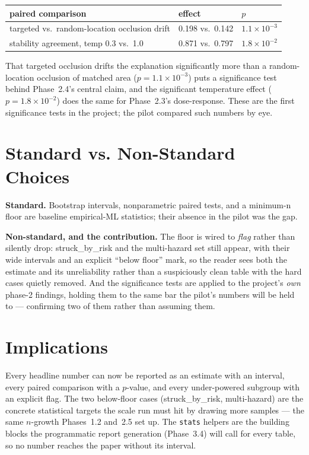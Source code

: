 \begin{center}
\begin{tabular}{p{6.4cm}p{3.0cm}p{2.6cm}}
\toprule
\textbf{paired comparison} & \textbf{effect} & \textbf{$p$} \\
\midrule
targeted vs.\ random-location occlusion drift & 0.198 vs.\ 0.142 & $1.1\times10^{-3}$ \\
stability agreement, temp 0.3 vs.\ 1.0        & 0.871 vs.\ 0.797 & $1.8\times10^{-2}$ \\
\bottomrule
\end{tabular}
\label{tab:p31-wilcoxon}
\end{center}

That targeted occlusion drifts the explanation significantly more than a random-location occlusion of
matched area ($p = 1.1\times10^{-3}$) puts a significance test behind Phase~2.4's central claim, and the
significant temperature effect ($p = 1.8\times10^{-2}$) does the same for Phase~2.3's dose-response.
These are the first significance tests in the project; the pilot compared such numbers by eye.

\section{Standard vs. Non-Standard Choices}

\textbf{Standard.} Bootstrap intervals, nonparametric paired tests, and a minimum-n floor are baseline
empirical-ML statistics; their absence in the pilot was the gap.

\textbf{Non-standard, and the contribution.} The floor is wired to \emph{flag} rather than silently
drop: struck\_by\_risk and the multi-hazard set still appear, with their wide intervals and an explicit
``below floor'' mark, so the reader sees both the estimate and its unreliability rather than a
suspiciously clean table with the hard cases quietly removed. And the significance tests are applied to
the project's \emph{own} phase-2 findings, holding them to the same bar the pilot's numbers will be held
to --- confirming two of them rather than assuming them.

\section{Implications}

Every headline number can now be reported as an estimate with an interval, every paired comparison with
a $p$-value, and every under-powered subgroup with an explicit flag. The two below-floor cases
(struck\_by\_risk, multi-hazard) are the concrete statistical targets the scale run must hit by drawing
more samples --- the same $n$-growth Phases~1.2 and~2.5 set up. The \texttt{stats} helpers are the
building blocks the programmatic report generation (Phase~3.4) will call for every table, so no number
reaches the paper without its interval.
